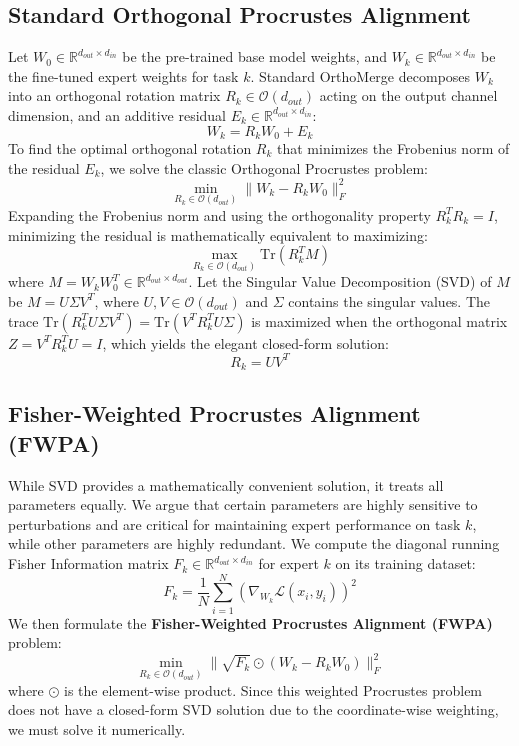 \documentclass{article}
\theoremstyle{plain}
\theoremstyle{definition}
\theoremstyle{remark}
\begin{document}
\subsection{Standard Orthogonal Procrustes Alignment}
Let $W_0 \in \mathbb{R}^{d_{out} \times d_{in}}$ be the pre-trained base model weights, and $W_k \in \mathbb{R}^{d_{out} \times d_{in}}$ be the fine-tuned expert weights for task $k$. Standard OrthoMerge \cite{orthomerge} decomposes $W_k$ into an orthogonal rotation matrix $R_k \in \mathcal{O}(d_{out})$ acting on the output channel dimension, and an additive residual $E_k \in \mathbb{R}^{d_{out} \times d_{in}}$:
\begin{equation}
    W_k = R_k W_0 + E_k
\end{equation}
To find the optimal orthogonal rotation $R_k$ that minimizes the Frobenius norm of the residual $E_k$, we solve the classic Orthogonal Procrustes problem:
\begin{equation}
    \label{eq:standard_procrustes}
    \min_{R_k \in \mathcal{O}(d_{out})} \| W_k - R_k W_0 \|_F^2
\end{equation}
Expanding the Frobenius norm and using the orthogonality property $R_k^T R_k = I$, minimizing the residual is mathematically equivalent to maximizing:
\begin{equation}
    \max_{R_k \in \mathcal{O}(d_{out})} \text{Tr}(R_k^T M)
\end{equation}
where $M = W_k W_0^T \in \mathbb{R}^{d_{out} \times d_{out}}$. Let the Singular Value Decomposition (SVD) of $M$ be $M = U \Sigma V^T$, where $U, V \in \mathcal{O}(d_{out})$ and $\Sigma$ contains the singular values. The trace $\text{Tr}(R_k^T U \Sigma V^T) = \text{Tr}(V^T R_k^T U \Sigma)$ is maximized when the orthogonal matrix $Z = V^T R_k^T U = I$, which yields the elegant closed-form solution:
\begin{equation}
    R_k = U V^T
\end{equation}

\subsection{Fisher-Weighted Procrustes Alignment (FWPA)}
While SVD provides a mathematically convenient solution, it treats all parameters equally. We argue that certain parameters are highly sensitive to perturbations and are critical for maintaining expert performance on task $k$, while other parameters are highly redundant. We compute the diagonal running Fisher Information matrix $F_k \in \mathbb{R}^{d_{out} \times d_{in}}$ for expert $k$ on its training dataset:
\begin{equation}
    F_k = \frac{1}{N} \sum_{i=1}^N \left( \nabla_{W_k} \mathcal{L}(x_i, y_i) \right)^2
\end{equation}
We then formulate the \textbf{Fisher-Weighted Procrustes Alignment (FWPA)} problem:
\begin{equation}
    \min_{R_k \in \mathcal{O}(d_{out})} \| \sqrt{F_k} \odot (W_k - R_k W_0) \|_F^2
\end{equation}
where $\odot$ is the element-wise product. Since this weighted Procrustes problem does not have a closed-form SVD solution due to the coordinate-wise weighting, we must solve it numerically.
\end{document}
